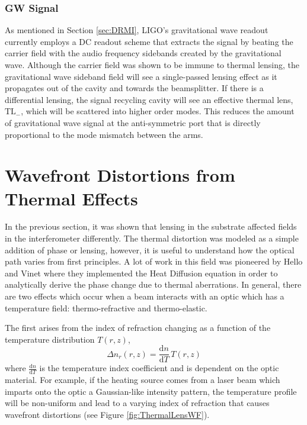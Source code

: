 		\subsubsection{GW Signal}
		As mentioned in Section \ref{sec:DRMI}, LIGO's gravitational wave readout currently employs a DC readout scheme that extracts the signal by beating the carrier field with the audio frequency sidebands created by the gravitational wave.  Although the carrier field was shown to be immune to thermal lensing, the gravitational wave sideband field will see a single-passed lensing effect as it propagates out of the cavity and towards the beamsplitter.  If there is a differential lensing, the signal recycling cavity will see an effective thermal lens, $\text{TL}_{-}$, which will be scattered into higher order modes.  This reduces the amount of gravitational wave signal at the anti-symmetric port that is directly proportional to the mode mismatch between the arms.
	
	\section{Wavefront Distortions from Thermal Effects}\label{sec:wf_dist}
	In the previous section, it was shown that lensing in the substrate affected fields in the interferometer differently.  The thermal distortion was modeled as a simple addition of phase or lensing, however, it is useful to understand how the optical path varies from first principles.  A lot of work in this field was pioneered by Hello and Vinet \cite{hello_vinet} \cite{Vinet_Thermal_Issues} where they implemented the Heat Diffusion equation in order to analytically derive the phase change due to thermal aberrations.  In general, there are two effects which occur when a beam interacts with an optic which has a temperature field: thermo-refractive and thermo-elastic.  
	
	The first arises from the index of refraction changing as a function of the temperature distribution $T(r,z)$,
	\begin{equation}
	\Delta n_{r}(r,z) = \frac{\text{d}n}{\text{d}T} \, T(r,z)
	\end{equation}
	where $\frac{\text{d}n}{\text{d}T}$ is the temperature index coefficient and is dependent on the optic material.  For example, if the heating source comes from a laser beam which imparts onto the optic a Gaussian-like intensity pattern, the temperature profile will be non-uniform and lead to a varying index of refraction that causes wavefront distortions (see Figure \ref{fig:ThermalLensWF}).


